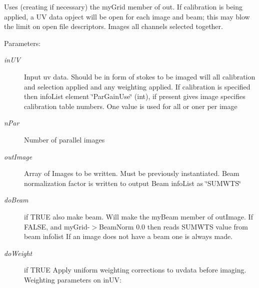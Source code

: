 Uses (creating if necessary) the my\-Grid member of out. If calibration is being applied, a UV data opject will be open for each image and beam; this may blow the limit on open file descriptors. Images all channels selected together. \begin{Desc}
\item[Parameters:]
\begin{description}
\item[{\em in\-UV}]Input uv data. Should be in form of stokes to be imaged will all calibration and selection applied and any weighting applied. If calibration is specified then info\-List element \char`\"{}Par\-Gain\-Use\char`\"{} (int), if present gives image specifies calibration table numbers. One value is used for all or oner per image \item[{\em n\-Par}]Number of parallel images \item[{\em out\-Image}]Array of Images to be written. Must be previously instantiated. Beam normalization factor is written to output Beam info\-List as \char`\"{}SUMWTS\char`\"{} \item[{\em do\-Beam}]if TRUE also make beam. Will make the my\-Beam member of out\-Image. If FALSE, and my\-Grid-$>$Beam\-Norm 0.0 then reads SUMWTS value from beam infolist If an image does not have a beam one is always made. \item[{\em do\-Weight}]if TRUE Apply uniform weighting corrections to uvdata before imaging. Weighting parameters on in\-UV: \begin{itemize}

\end{itemize}
\end{description}
\end{Desc}
